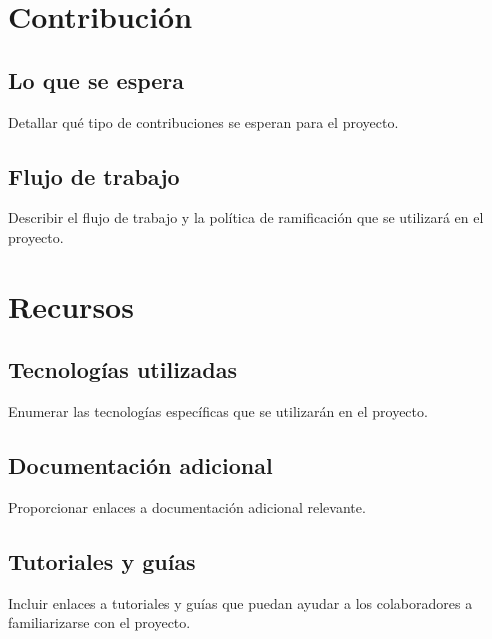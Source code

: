 \documentclass[a4paper,11pt]{article}                 %
\begin{document}
  \section{Contribución}
  \subsection{Lo que se espera}
    Detallar qué tipo de contribuciones se esperan para el proyecto.
  \subsection{Flujo de trabajo}
    Describir el flujo de trabajo y la política de ramificación que se utilizará en el proyecto.

  \section{Recursos}
  \subsection{Tecnologías utilizadas}
    Enumerar las tecnologías específicas que se utilizarán en el proyecto.
  \subsection{Documentación adicional}
    Proporcionar enlaces a documentación adicional relevante.
  \subsection{Tutoriales y guías}
    Incluir enlaces a tutoriales y guías que puedan ayudar a los colaboradores a familiarizarse con el proyecto.

\end{document}
